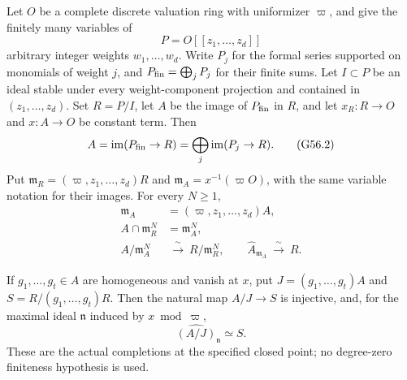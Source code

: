 \begin{proposition}
\label{AC-G56-jets}
Let $O$ be a complete discrete valuation ring with
uniformizer $\varpi$, and give the finitely many
variables of
\[
             P=O[[z_1,\ldots,z_d]]
                                                               \tag{G56.1}
\]
arbitrary integer weights $w_1,\ldots,w_d$.
Write $P_j$ for the formal series supported on
monomials of weight $j$, and
$P_{\rm fin}=\bigoplus_jP_j$ for their finite sums.
Let $I\subset P$ be an ideal stable under every
weight-component projection and contained in
$(z_1,\ldots,z_d)$.
Set $R=P/I$, let $A$ be the image of $P_{\rm fin}$ in
$R$, and let $x_R:R\to O$ and $x:A\to O$ be constant
term.  Then
\[
 A=\operatorname{im}(P_{\rm fin}\to R)
   =\bigoplus_j\operatorname{im}(P_j\to R).
                                                               \tag{G56.2}
\]
Put $\mathfrak m_R=(\varpi,z_1,\ldots,z_d)R$ and
$\mathfrak m_A=x^{-1}(\varpi O)$, with the same
variable notation for their images.  For every
$N\geq1$,
\[
 \begin{split}
 \mathfrak m_A&=(\varpi,z_1,\ldots,z_d)A,\\
 A\cap\mathfrak m_R^N&=\mathfrak m_A^N,\\
 A/\mathfrak m_A^N&\ \xrightarrow{\ \sim\ }\
                       R/\mathfrak m_R^N,
 \qquad
 \widehat A_{\mathfrak m_A}\ \xrightarrow{\ \sim\ }\ R .
 \end{split}                                                   \tag{G56.3}
\]

If $g_1,\ldots,g_t\in A$ are homogeneous and vanish
at $x$, put $J=(g_1,\ldots,g_t)A$ and
$S=R/(g_1,\ldots,g_t)R$.  Then the natural map
$A/J\to S$ is injective, and, for the maximal ideal
$\mathfrak n$ induced by $x\bmod\varpi$,
\[
             \widehat{(A/J)}_{\mathfrak n}\simeq S .
                                                               \tag{G56.4}
\]
These are the actual completions at the specified
closed point; no degree-zero finiteness hypothesis
is used.
\end{proposition}
